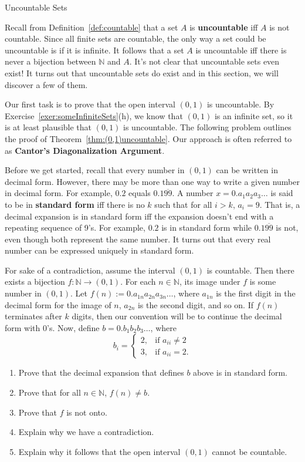 \begin{section}{Uncountable Sets}

Recall from Definition~\ref{def:countable} that a set $A$ is \textbf{uncountable} iff $A$ is not countable.  Since all finite sets are countable, the only way a set could be uncountable is if it is infinite.  It follows that a set $A$ is uncountable iff there is never a bijection between $\mathbb{N}$ and $A$.  It's not clear that uncountable sets even exist!  It turns out that uncountable sets do exist and in this section, we will discover a few of them.

Our first task is to prove that the open interval $(0,1)$ is uncountable.  By Exercise~\ref{exer:someInfiniteSets}(h), we know that $(0,1)$ is an infinite set, so it is at least plausible that $(0,1)$ is uncountable.  The following problem outlines the proof of Theorem~\ref{thm:(0,1)uncountable}.  Our approach is often referred to as \textbf{Cantor's Diagonalization Argument}.

Before we get started, recall that every number in $(0,1)$ can be written in decimal form. However, there may be more than one way to write a given number in decimal form.  For example, $0.2$ equals $0.1\overline{99}$.  A number $x=0.a_1a_2a_3\ldots$ is said to be in \textbf{standard form} iff there is no $k$ such that for all $i>k$, $a_i=9$. That is, a decimal expansion is in standard form iff the expansion doesn't end with a repeating sequence of 9's. For example, $0.2$ is in standard form while $0.1\overline{99}$ is not, even though both represent the same number. It turns out that every real number can be expressed uniquely in standard form.

\begin{problem}
For sake of a contradiction, assume the interval $(0,1)$ is countable.  Then there exists a bijection $f:\mathbb{N}\to (0,1)$. For each $n\in\mathbb{N}$, its image under $f$ is some number in $(0,1)$.  Let $f(n):=0.a_{1n}a_{2n}a_{3n}\ldots$, where $a_{1n}$ is the first digit in the decimal form for the image of $n$, $a_{2n}$ is the second digit, and so on. If $f(n)$ terminates after $k$ digits, then our convention will be to continue the decimal form with 0's. Now, define $b=0.b_1b_2b_3\ldots$, where
\[
b_i=\begin{cases}
2, & \text{if }a_{ii}\neq 2\\
3, & \text{if }a_{ii}=2.
\end{cases}
\]
\begin{enumerate}[label=\textrm{(\alph*)}]
\item Prove that the decimal expansion that defines $b$ above is in standard form.
\item Prove that for all $n\in\mathbb{N}$, $f(n)\neq b$.
\item Prove that $f$ is not onto.
\item Explain why we have a contradiction.
\item Explain why it follows that the open interval $(0,1)$ cannot be countable.
\end{enumerate}
\end{problem}


\end{section}
